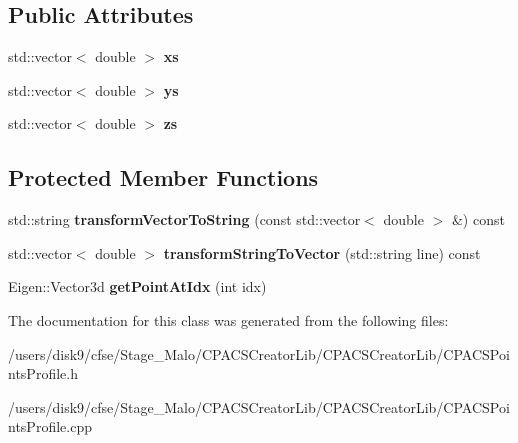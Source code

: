 \subsection*{Public Attributes}
\begin{DoxyCompactItemize}
\item 
\hypertarget{classcpcr_1_1CPACSPointsProfile_ae7c9fecfe6ba58f3c4c3687bbbb77124}{std\-::vector$<$ double $>$ {\bfseries xs}}\label{classcpcr_1_1CPACSPointsProfile_ae7c9fecfe6ba58f3c4c3687bbbb77124}

\item 
\hypertarget{classcpcr_1_1CPACSPointsProfile_aa77c26c1a08edd4b395bcb93e4105558}{std\-::vector$<$ double $>$ {\bfseries ys}}\label{classcpcr_1_1CPACSPointsProfile_aa77c26c1a08edd4b395bcb93e4105558}

\item 
\hypertarget{classcpcr_1_1CPACSPointsProfile_a7c989ed69a9fd81660922a53aaa33dc0}{std\-::vector$<$ double $>$ {\bfseries zs}}\label{classcpcr_1_1CPACSPointsProfile_a7c989ed69a9fd81660922a53aaa33dc0}

\end{DoxyCompactItemize}
\subsection*{Protected Member Functions}
\begin{DoxyCompactItemize}
\item 
\hypertarget{classcpcr_1_1CPACSPointsProfile_aa0f759b8235b66a4c4be993dcb181919}{std\-::string {\bfseries transform\-Vector\-To\-String} (const std\-::vector$<$ double $>$ \&) const }\label{classcpcr_1_1CPACSPointsProfile_aa0f759b8235b66a4c4be993dcb181919}

\item 
\hypertarget{classcpcr_1_1CPACSPointsProfile_a8d16da60ec46f62ab8d5f60452eb3545}{std\-::vector$<$ double $>$ {\bfseries transform\-String\-To\-Vector} (std\-::string line) const }\label{classcpcr_1_1CPACSPointsProfile_a8d16da60ec46f62ab8d5f60452eb3545}

\item 
\hypertarget{classcpcr_1_1CPACSPointsProfile_a337e9a9754fa112d1a350d0793f4c043}{Eigen\-::\-Vector3d {\bfseries get\-Point\-At\-Idx} (int idx)}\label{classcpcr_1_1CPACSPointsProfile_a337e9a9754fa112d1a350d0793f4c043}

\end{DoxyCompactItemize}


The documentation for this class was generated from the following files\-:\begin{DoxyCompactItemize}
\item 
/users/disk9/cfse/\-Stage\-\_\-\-Malo/\-C\-P\-A\-C\-S\-Creator\-Lib/\-C\-P\-A\-C\-S\-Creator\-Lib/C\-P\-A\-C\-S\-Points\-Profile.\-h\item 
/users/disk9/cfse/\-Stage\-\_\-\-Malo/\-C\-P\-A\-C\-S\-Creator\-Lib/\-C\-P\-A\-C\-S\-Creator\-Lib/C\-P\-A\-C\-S\-Points\-Profile.\-cpp\end{DoxyCompactItemize}
